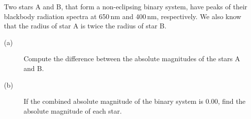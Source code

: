 Two stars A and B, that form a non-eclipsing binary system, have peaks of their blackbody radiation spectra at 650\,nm and 400\,nm, respectively. We also know that the radius of star A is twice the radius of star B.
\begin{description}
\item[(a)] Compute the difference between the absolute magnitudes of the stars A and B.
\item[(b)] If the combined absolute magnitude of the binary system is 0.00, find the absolute magnitude of each star.
\end{description}
